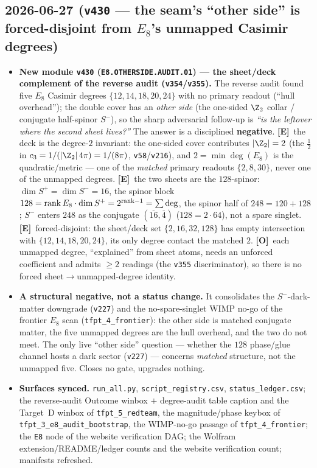 \documentclass[11pt]{article}
\providecommand{\mE}{\textbf{[E]}}\providecommand{\mC}{\textbf{[C]}}
\providecommand{\mO}{\textbf{[O]}}\providecommand{\mX}{\textbf{[X]}}
\providecommand{\vref}[1]{\texttt{#1}}
\providecommand{\cthree}{c_3}\providecommand{\phiz}{\varphi_0^{\mathrm{ret}}}
\begin{document}
\subsection*{2026-06-27 (\texttt{v430} --- the seam's ``other side'' is forced-disjoint from $E_8$'s unmapped Casimir degrees)}
\begin{itemize}
\item \textbf{New module \texttt{v430} (\texttt{E8.OTHERSIDE.AUDIT.01}) --- the sheet/deck complement of the
reverse audit (\vref{v354}/\vref{v355}).} The reverse audit found five $E_8$ Casimir degrees
$\{12,14,18,20,24\}$ with no primary readout (``hull overhead''); the double cover has an \emph{other side}
(the one-sided $\Z_2$ collar / conjugate half-spinor $S^-$), so the sharp adversarial follow-up is
\emph{``is the leftover where the second sheet lives?''} The answer is a disciplined \textbf{negative}.
\mE\ the deck is the degree-$2$ invariant: the one-sided cover contributes $|\Z_2|=2$ (the $\tfrac12$ in
$\cthree=1/(|\Z_2|\,4\pi)=1/(8\pi)$, \vref{v58}/\vref{v216}), and $2=\min\deg(E_8)$ is the quadratic/metric ---
one of the \emph{matched} primary readouts $\{2,8,30\}$, never one of the unmapped degrees.
\mE\ the two sheets are the $128$-spinor: $\dim S^+{=}\dim S^-{=}16$, the spinor block
$128={\rm rank}\,E_8\cdot\dim S^+=2^{{\rm rank}-1}=\sum\deg$, the spinor half of $248=120+128$; $S^-$ enters
$248$ as the conjugate $(\overline{16},\overline4)$ ($128=2\cdot64$), not a spare singlet.
\mE\ forced-disjoint: the sheet/deck set $\{2,16,32,128\}$ has empty intersection with $\{12,14,18,20,24\}$,
its only degree contact the matched $2$. \mO\ each unmapped degree, ``explained'' from sheet atoms, needs an
unforced coefficient and admits $\ge2$ readings (the \vref{v355} discriminator), so there is no forced
sheet$\to$unmapped-degree identity.
\item \textbf{A structural negative, not a status change.} It consolidates the $S^-$-dark-matter downgrade
(\vref{v227}) and the no-spare-singlet WIMP no-go of the frontier $E_8$ scan (\texttt{tfpt\_4\_frontier}): the
other side is matched conjugate matter, the five unmapped degrees are the hull overhead, and the two do not
meet. The only live ``other side'' question --- whether the $128$ phase/glue channel hosts a dark sector
(\vref{v227}) --- concerns \emph{matched} structure, not the unmapped five. Closes no gate, upgrades nothing.
\item \textbf{Surfaces synced.} \texttt{run\_all.py}, \texttt{script\_registry.csv},
\texttt{status\_ledger.csv}; the reverse-audit Outcome winbox $+$ degree-audit table caption and the Target~D
winbox of \texttt{tfpt\_5\_redteam}, the magnitude/phase keybox of \texttt{tfpt\_3\_e8\_audit\_bootstrap}, the
WIMP-no-go passage of \texttt{tfpt\_4\_frontier}; the \texttt{E8} node of the website verification DAG; the
Wolfram extension/README/ledger counts and the website verification count; manifests refreshed.
\end{itemize}
\end{document}
